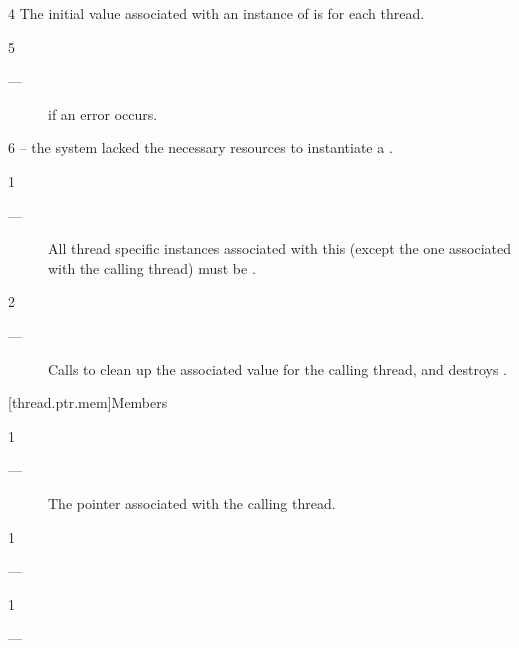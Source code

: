 \documentclass[fontsize=10pt,paper=A4,pagesize,DIV=15]{scrartcl}
\begin{document}
4 \remarks
The initial value associated with an instance of \tptr is  for
each thread.

5 \except
\begin{description}
    \item[---]  if an error occurs.
\end{description}

6 \errors
{} -- the system lacked the necessary
resources to instantiate a \tptr.


1 \requires
\begin{description}
    \item[---] All thread specific instances associated with this \tptr
               (except the one associated with the calling thread) must be
               .
\end{description}

2 \effects
\begin{description}
    \item[---] Calls  to clean up the associated value for the
               calling thread, and destroys \this.
\end{description}


[thread.ptr.mem]{Members}


1 \returns
\begin{description}
    \item[---] The pointer associated with the calling thread.
\end{description}


1 \returns
\begin{description}
    \item[---] 
\end{description}


1 \requires
\begin{description}
    \item[---] 
\end{description}
\end{document}
